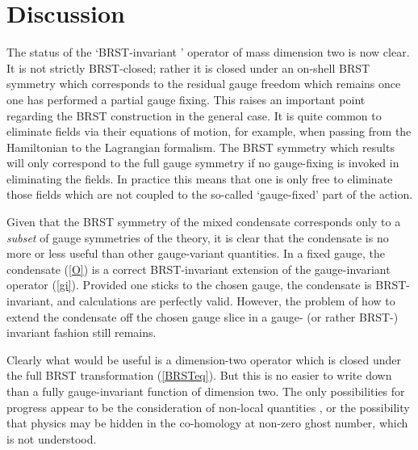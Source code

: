 \documentclass[a4paper,a4paper]{article}
\begin{document}
\section{Discussion}
The status of the `BRST-invariant ' operator of mass dimension two is now clear. It is not strictly BRST-closed; rather it is closed under an on-shell BRST symmetry which corresponds to the residual gauge freedom which remains once one has performed a partial gauge fixing. This raises an important point regarding the BRST construction in the general case. It is quite common to eliminate fields via their equations of motion, for example, when passing from the Hamiltonian to the Lagrangian formalism. The BRST symmetry which results will only correspond to the full gauge symmetry if no gauge-fixing is invoked in eliminating the fields. In practice this means that one is only free to eliminate those fields which are not coupled to the so-called `gauge-fixed' part of the action.

Given that the BRST symmetry of the mixed condensate corresponds only to a \emph{subset} of gauge symmetries of the theory, it is clear that the condensate is no more or less useful than other gauge-variant quantities. In a fixed gauge, the condensate (\ref{O}) is a correct BRST-invariant extension of the gauge-invariant operator (\ref{gi}).  Provided one sticks to the chosen gauge, the condensate is BRST-invariant, and calculations are perfectly valid. However, the problem of how to extend the condensate off the chosen gauge slice in a gauge- (or rather BRST-) invariant fashion still remains. 

Clearly what would be useful is a dimension-two operator which is closed under the full BRST transformation (\ref{BRSTeq}). But this is no easier to write down than a fully gauge-invariant function of dimension two. The only possibilities for progress appear to be the consideration of non-local quantities \cite{Gubarev:2000eu}, or the possibility that physics may be hidden in the co-homology at non-zero ghost number, which is not understood.
\end{document}
